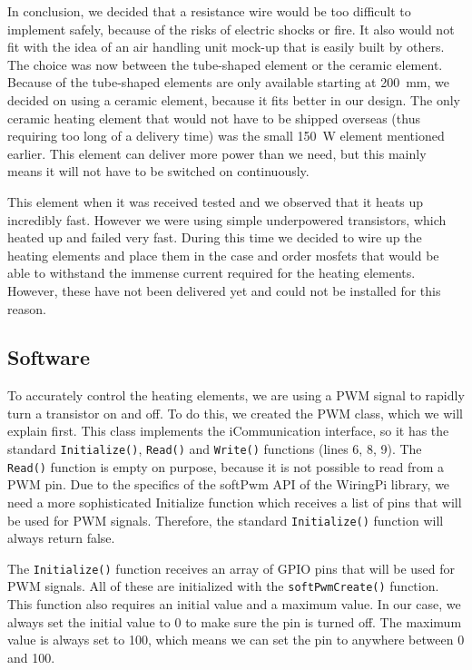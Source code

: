 \documentclass[a4paper,oneside]{book}
\begin{document}
In conclusion, we decided that a resistance wire would be too difficult to
implement safely, because of the risks of electric shocks or fire. It also
would not fit with the idea of an air handling unit mock-up that is easily
built by others. The choice was now between the tube-shaped element or the
ceramic element. Because of the tube-shaped elements are only available
starting at \SI{200}{\mm}, we decided on using a ceramic element, because it
fits better in our design. The only ceramic heating element that would not have
to be shipped overseas (thus requiring too long of a delivery time) was the
small \SI{150}{\W} element mentioned earlier. This element can deliver more
power than we need, but this mainly means it will not have to be switched on
continuously.

This element when it was received tested and we observed that it heats up
incredibly fast. However we were using simple underpowered transistors, which
heated up and failed very fast. During this time we decided to wire up the
heating elements and place them in the case and order mosfets that would be
able to withstand the immense current required for the heating elements.
However, these have not been delivered yet and could not be installed for this
reason.

\subsection{Software}
To accurately control the heating elements, we are using a PWM signal to
rapidly turn a transistor on and off. To do this, we created the PWM class,
which we will explain first. This class implements the iCommunication
interface, so it has the standard \lstinline|Initialize()|, \lstinline|Read()|
and \lstinline|Write()| functions (lines 6, 8, 9). The \lstinline|Read()|
function is empty on purpose, because it is not possible to read from a PWM
pin. Due to the specifics of the softPwm API of the WiringPi library, we need a
more sophisticated Initialize function which receives a list of pins that will
be used for PWM signals.  Therefore, the standard \lstinline|Initialize()|
function will always return false.



The \lstinline|Initialize()| function receives an array of GPIO pins that will
be used for PWM signals. All of these are initialized with the
\lstinline|softPwmCreate()| function.  This function also requires an initial
value and a maximum value. In our case, we always set the initial value to 0 to
make sure the pin is turned off. The maximum value is always set to 100, which
means we can set the pin to anywhere between 0 and 100.
\end{document}

